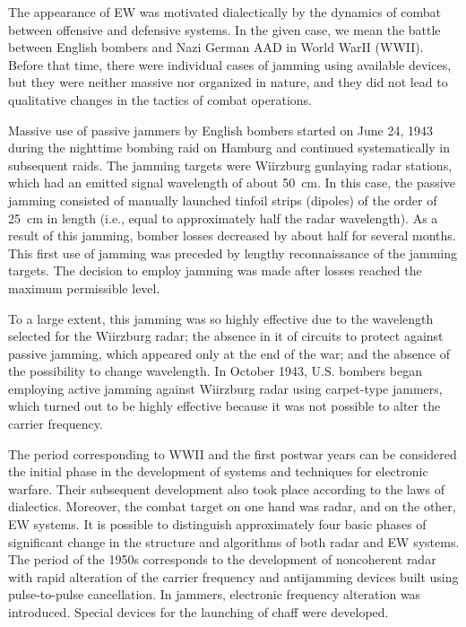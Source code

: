 \documentclass[palatino,english,purist]{ist-report}
\begin{document}
The appearance of EW was motivated dialectically by the dynamics of
combat between offensive and defensive systems. In the given case, we mean the battle between English bombers and Nazi German AAD in World WarII (WWII). Before that time, there were individual cases of jamming using available devices, but they were neither massive nor organized in nature, and they did not lead to qualitative changes in the tactics of combat operations.

Massive use of passive jammers by English bombers started on June 24, 1943 during the nighttime bombing raid on Hamburg and continued systematically in subsequent raids. The jamming targets were Wiirzburg gunlaying radar stations, which had an emitted signal wavelength of about \SI{50}{\centi\meter}. In this case, the passive jamming consisted of manually launched tinfoil strips (dipoles) of the order of \SI{25}{\centi\meter} in length (i.e., equal to approximately half the radar wavelength). As a result of this jamming, bomber losses decreased by about half for several months. This first use of jamming was preceded by lengthy reconnaissance of the jamming targets.
The decision to employ jamming was made after losses reached the
maximum permissible level.

To a large extent, this jamming was so highly effective due to the
wavelength selected for the Wiirzburg radar; the absence in it of circuits to protect against passive jamming, which appeared only at the end of the war; and the absence of the possibility to change wavelength. In October 1943, U.S. bombers began employing active jamming against Wiirzburg radar using carpet-type jammers, which turned out to be highly effective because it was not possible to alter the carrier frequency.

The period corresponding to WWII and the first postwar years can be
considered the initial phase in the development of systems and techniques for electronic warfare.
Their subsequent development also took place according to the laws of
dialectics. Moreover, the combat target on one hand was radar, and on the other, EW systems. It is possible to distinguish approximately four basic phases of significant change in the structure and algorithms of both radar and EW systems. The period of the 1950s corresponds to the development of noncoherent radar with rapid alteration of the carrier frequency and antijamming devices built using pulse-to-pulse cancellation. In jammers, electronic frequency alteration was introduced. Special devices for the launching of chaff were developed.
\end{document}
